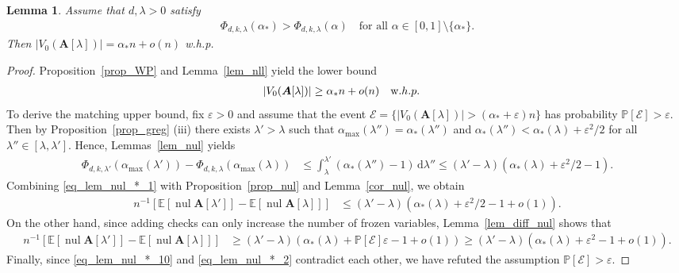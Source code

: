 \documentclass[10pt,reqno]{amsart}
\numberwithin{equation}{section}
\renewcommand{\vec}[1]{\boldsymbol{#1}}
\newcommand{\amax}{\alpha_{\max}}
\newcommand{\frz}{V_0}
\newcommand\cE{\mathcal E}
\newcommand\vA{\vec A}
\newcommand\eps{\varepsilon}
\newcommand\Erw{\mathbb{E}}
\newcommand\ex{\Erw}
\newcommand\brk[1]{\left\lbrack{#1}\right\rbrack}
\newcommand{\whp}{w.h.p.}
\newcommand\pr{\mathbb{P}}
\newcommand\Lem{Lemma}
\newcommand\Prop{Proposition}
\newtheorem{lemma}[definition]{Lemma}
\DeclareMathOperator{\nul}{nul}
\def\pr{{\mathbb P}}
\begin{document}
\begin{lemma}\label{lem_nul_*}
	Assume that $d,\lambda>0$ satisfy
	\begin{align}\label{eq_cor_frz_*}
		\Phi_{d,k,\lambda}(\alpha_*)>\Phi_{d,k,\lambda}(\alpha)\quad\mbox{for all $\alpha\in[0,1]\setminus\{\alpha_*\}$.}
	\end{align}
	Then $|\frz(\vA[\lambda])|=\alpha_*n+o(n)$ \whp
\end{lemma}
\begin{proof}
	\Prop~\ref{prop_WP} and \Lem~\ref{lem_nll} yield the lower bound
	\begin{align}\label{eq_lem_nul_*_0}
		|\frz(\vA[\lambda])|&\geq\alpha_*n+o(n)&&\mbox\whp
	\end{align}
	To derive the matching upper bound, fix $\eps>0$ and assume that the event $\cE=\{|\frz(\vA[\lambda])|>(\alpha_*+\eps)n\}$ has probability $\pr\brk\cE>\eps$.
	Then by \Prop~\ref{prop_greg} (iii) there exists $\lambda'>\lambda$ such that $\amax(\lambda'')=\alpha_*(\lambda'')$ and $\alpha_*(\lambda'')<\alpha_*(\lambda)+\eps^2/2$ for all $\lambda''\in[\lambda,\lambda']$.
	Hence, \Lem s~\ref{lem_nul} yields
\begin{align}\label{eq_lem_nul_*_1}
		\Phi_{d,k,\lambda'}(\amax(\lambda'))-\Phi_{d,k,\lambda}(\amax(\lambda))&\leq\int_{\lambda}^{\lambda'}(\alpha_*(\lambda'')-1)\,\mathrm d\lambda''\leq(\lambda'-\lambda)(\alpha_*(\lambda)+\eps^2/2-1).
	\end{align}
	Combining \eqref{eq_lem_nul_*_1} with \Prop~\ref{prop_nul} and \Lem~\ref{cor_nul}, we obtain
	\begin{align}\label{eq_lem_nul_*_10}
		n^{-1}\brk{\ex\brk{\nul\vA[\lambda']}-\ex\brk{\nul\vA[\lambda]}}&\leq(\lambda'-\lambda)(\alpha_*(\lambda)+\eps^2/2-1+o(1)).
	\end{align}
	On the other hand, since adding checks can only increase the number of frozen variables, \Lem~\ref{lem_diff_nul} shows that
	\begin{align}\label{eq_lem_nul_*_2}
		n^{-1}\brk{\ex\brk{\nul\vA[\lambda']}-\ex\brk{\nul\vA[\lambda]}}&\geq(\lambda'-\lambda)(\alpha_*(\lambda)+\pr\brk{\cE}\eps-1+o(1))\geq(\lambda'-\lambda)(\alpha_*(\lambda)+\eps^2-1+o(1)).
	\end{align}
	Finally, since \eqref{eq_lem_nul_*_10} and \eqref{eq_lem_nul_*_2} contradict each other, we have refuted the assumption $\pr\brk{\cE}>\eps$.
\end{proof}
\end{document}
